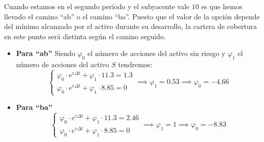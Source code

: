 \begin{problem}[1]
Cuando estamos en el segundo período y el subyacente vale $10$ es que hemos llevado el camino ``ab'' o el camino ``ba''. Puesto que el valor de la opción depende
del mínimo alcanzado por el activo durante su desarrollo, la cartera de cobertura en este punto será distinta según el camino seguido.

\begin{itemize}
\item \textbf{Para ``ab''}
Siendo $\varphi_0$ el número de acciones del activo sin riesgo y $\varphi_1$ el número de acciones del activo $S$ tendremos:
\[\left\{ \begin{array}{l}
\varphi_0 \cdot e^{rΔt} + \varphi_1 \cdot 11.3 = 1.3\\
\varphi_0 \cdot e^{rΔt} + \varphi_1 \cdot 8.85 = 0
\end{array}\right. \implies \varphi_1 = 0.53 \implies \varphi_0 = -4.66\]

\item \textbf{Para ``ba''}
\[\left\{ \begin{array}{l}
\varphi_0 \cdot e^{rΔt} + \varphi_1 \cdot 11.3 = 2.46\\
\varphi_0 \cdot e^{rΔt} + \varphi_1 \cdot 8.85 = 0
\end{array}\right. \implies \varphi_1 = 1 \implies \varphi_0 = -8.83\]
\end{itemize}


\end{problem}

